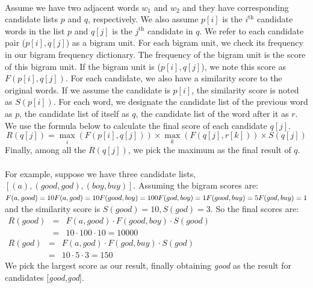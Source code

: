 \documentclass[twocolumn,10pt]{article}
\begin{document}
\paragraph{} Assume we have two adjacent words $w_1$ and $w_2$ and they have corresponding candidate lists $p$ and $q$, respectively. We also assume $p[i]$ is the $i^{\text{th}}$ candidate words in the list $p$ and $q[j]$ is the $j^{\text{th}}$ candidate in $q$. We refer to each candidate pair ($p[i], q[j]$) as a bigram unit. For each bigram unit, we check its frequency in our bigram frequency dictionary. The frequency of the bigram unit is the score of this bigram unit. If the bigram unit is ($p[i],q[j]$), we note this score as $F(p[i],q[j])$. For each candidate, we also have a similarity score to the original words. If we assume the candidate is $p[i]$, the similarity score is noted as $S(p[i])$. For each word, we designate the candidate list of the previous word as $p$, the candidate list of itself as $q$, the candidate list of the word after it as $r$. We use the formula below to calculate the final score of each candidate $q[j]$.
$$R(q[j]) = \max_i(F(p[i],q[j])) \times \max_k(F(q[j],r[k]))\times S(q[j])$$
Finally, among all the $R(q[j])$, we pick the maximum as the final result of $q$.
\paragraph{}For example, suppose we have three candidate lists, $[(a), (good, god), (boy, buy)]$. Assuming the bigram scores are:\\
$
F(a,good)=10\\
F(a, god)=10\\
F(good, boy)=100\\
F(god, boy)=1\\
F(good, buy)=5\\
F(god, buy)=1
$\\
and the similarity score is $S(good)=10, S(god)=3$. So the final scores are:\\
$\begin{array}{lcr}
R(good)&=&F(a,good)\cdot F(good,boy)\cdot S(good)\\
&=&10\cdot100\cdot10 = 10000\end{array}$\\

$\begin{array}{lcr}
R(god)&=&F(a,god)\cdot F(god,buy)\cdot S(god)\\
&=& 10\cdot5\cdot3=150\end{array}$\\
We pick the largest score as our result, finally obtaining \textit{good} as the result for candidates [\textit{good,god}]. 
\end{document}
